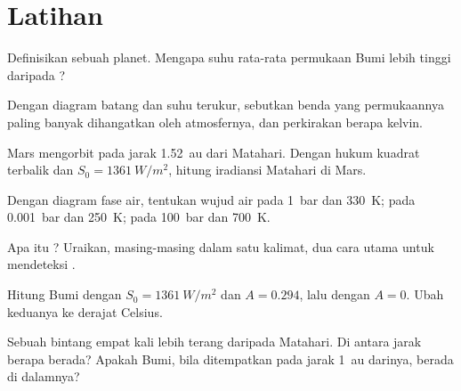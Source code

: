 \section{Latihan}

\begin{exercise}[$\star$]\label{exo:g10:habitable-planet:1}
Definisikan  sebuah planet. Mengapa suhu rata-rata permukaan
Bumi lebih tinggi daripada ?
\end{exercise}

\begin{exercise}[$\star$]\label{exo:g10:habitable-planet:2}
Dengan diagram batang  dan suhu terukur, sebutkan benda yang
permukaannya paling banyak dihangatkan oleh atmosfernya, dan perkirakan
berapa kelvin.
\end{exercise}

\begin{exercise}[$\star$]\label{exo:g10:habitable-planet:3}
Mars mengorbit pada jarak \qty{1.52}{au} dari Matahari. Dengan hukum kuadrat
terbalik dan $S_0 = \qty{1361}{W/m^2}$, hitung iradiansi Matahari di Mars.
\end{exercise}

\begin{exercise}[$\star$]\label{exo:g10:habitable-planet:4}
Dengan diagram fase air, tentukan wujud air pada \qty{1}{bar} dan
\qty{330}{K}; pada \qty{0.001}{bar} dan \qty{250}{K}; pada \qty{100}{bar} dan
\qty{700}{K}.
\end{exercise}

\begin{exercise}[$\star$]\label{exo:g10:habitable-planet:5}
Apa itu ? Uraikan, masing-masing dalam satu kalimat, dua cara utama
untuk mendeteksi .
\end{exercise}

\begin{exercise}[$\star\star$]\label{exo:g10:habitable-planet:6}
Hitung  Bumi dengan $S_0 = \qty{1361}{W/m^2}$ dan
$A = 0.294$, lalu dengan $A = 0$. Ubah keduanya ke derajat Celsius.
\end{exercise}

\begin{exercise}[$\star\star$]\label{exo:g10:habitable-planet:7}
Sebuah bintang empat kali lebih terang daripada Matahari. Di antara jarak
berapa  berada? Apakah Bumi, bila ditempatkan pada jarak
\qty{1}{au} darinya, berada di dalamnya?
\end{exercise}

